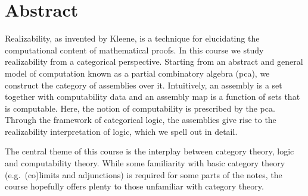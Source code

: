\chapter{Abstract}

Realizability, as invented by Kleene, is a technique for elucidating the
computational content of mathematical proofs. In this course we study
realizability from a categorical perspective.
%
Starting from an abstract and general model of computation known as a partial
combinatory algebra (pca), we construct the category of assemblies
over it.
%
Intuitively, an assembly is a set together with computability data and an
assembly map is a function of sets that is computable. Here, the notion of
computability is prescribed by the pca.
%
Through the framework of categorical logic, the assemblies give rise to the
realizability interpretation of logic, which we spell out in detail.

The central theme of this course is the interplay between category theory, logic
and computability theory. While some familiarity with basic category theory
(e.g.\ (co)limits and adjunctions) is required for some parts of the notes, the
course hopefully offers plenty to those unfamiliar with category theory.


